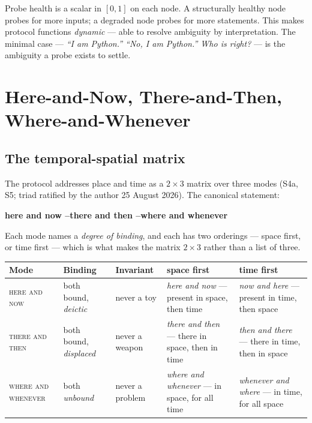 \documentclass[11pt,a4paper]{article}
\begin{document}
Probe health is a scalar in $[0,1]$ on each node. A structurally healthy node
probes for more inputs; a degraded node probes for more statements. This makes
protocol functions \emph{dynamic} --- able to resolve ambiguity by
interpretation. The minimal case --- \emph{``I am Python.'' ``No, I am
Python.'' Who is right?} --- is the ambiguity a probe exists to settle.

\section{Here-and-Now, There-and-Then, Where-and-Whenever}
\label{sec:addressing}

\subsection{The temporal-spatial matrix}

The protocol addresses place and time as a $2 \times 3$ matrix over three modes
(S4a, S5; triad ratified by the author 25 August 2026). The canonical statement:

\begin{ruleblock}
\begin{center}
\textbf{here and now \quad--\quad there and then \quad--\quad where and whenever}
\end{center}
\end{ruleblock}

Each mode names a \emph{degree of binding}, and each has two orderings --- space
first, or time first --- which is what makes the matrix $2 \times 3$ rather than
a list of three.

\begin{center}
\begin{tabular}{@{}>{\raggedright\arraybackslash}p{2.5cm}>{\raggedright\arraybackslash}p{2.0cm}>{\raggedright\arraybackslash}p{2.2cm}>{\raggedright\arraybackslash}p{3.6cm}>{\raggedright\arraybackslash}p{3.6cm}@{}}
\toprule
\textbf{Mode} & \textbf{Binding} & \textbf{Invariant} & \textbf{space first} & \textbf{time first} \\
\midrule
\textsc{here and now} & both bound, \emph{deictic} & never a toy &
  \emph{here and now} --- present in space, then time &
  \emph{now and here} --- present in time, then space \\[2pt]
\textsc{there and then} & both bound, \emph{displaced} & never a weapon &
  \emph{there and then} --- there in space, then in time &
  \emph{then and there} --- there in time, then in space \\[2pt]
\textsc{where and whenever} & both \emph{unbound} & never a problem &
  \emph{where and whenever} --- in space, for all time &
  \emph{whenever and where} --- in time, for all space \\
\bottomrule
\end{tabular}
\end{center}
\end{document}
